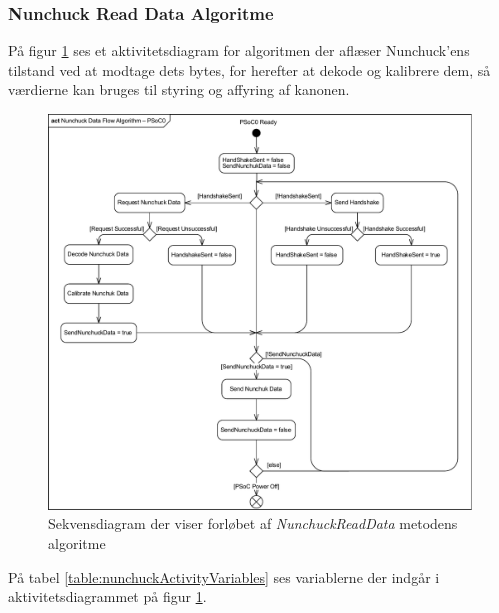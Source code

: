 \subsubsection{Nunchuck Read Data Algoritme}

På figur \ref{figure:nunchuckReadDataAlgorithm} ses et aktivitetsdiagram for algoritmen der aflæser Nunchuck'ens tilstand ved at modtage dets bytes, for herefter at dekode og kalibrere dem, så værdierne kan bruges til styring og affyring af kanonen.

\begin{figure}[H]
	\centering
	\includegraphics[width=\textwidth]{DesignOgImplementering/images/nunchuckFlowActivity}
	\caption{Sekvensdiagram der viser forløbet af \textit{NunchuckReadData} metodens algoritme}
	\label{figure:nunchuckReadDataAlgorithm}
\end{figure}

På tabel \ref{table:nunchuckActivityVariables} ses variablerne der indgår i aktivitetsdiagrammet på figur \ref{figure:nunchuckReadDataAlgorithm}.

